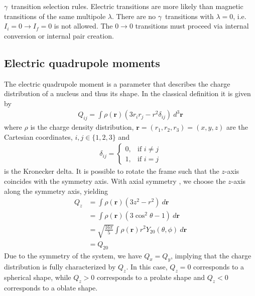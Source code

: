 \documentclass[twoside,english]{uiofysmaster/uiofysmaster}
\newcommand{\ga}{$\gamma$}
\begin{document}
\begin{table}[htb!] 
    \centering 
    \caption{\ga\ transition selection rules. Electric transitions are more likely than magnetic transitions of the same multipole $\lambda$. There are no \ga\ transitions with $\lambda = 0$, i.e. $I_i = 0 \rightarrow I_f = 0$ is not allowed. The $0 \rightarrow 0$ transitions must proceed via internal conversion or internal pair creation.}
	
	\label{tab:gamma_sel}
\end{table}



\subsection{Electric quadrupole moments}
The electric quadrupole moment is a parameter that describes the charge distribution of a nucleus and thus its shape.
In the classical definition it is given by
\begin{align}
	Q_{ij} = \int \rho(\mathbf{r}) (3r_i r_j - r^2 \delta_{ij}) ~d^3 \mathbf{r}
\end{align}
where $\rho$ is the charge density distribution, $\mathbf{r} = (r_1, r_2, r_3) = (x, y, z)$ are the Cartesian coordinates, $i,j \in \{ 1, 2, 3 \}$ and
\begin{align}
	\delta_{ij} =
    \begin{cases}
    		0, & \text{if } i \neq j \\
    		1, & \text{if } i = j
    \end{cases}
\end{align}
is the Kronecker delta.
It is possible to rotate the frame such that the $z$-axis coincides with the symmetry axis. 
With axial symmetry \cite{Niedermaier, ELP}, we choose the $z$-axis along the symmetry axis, yielding
\begin{align}
	Q_z &= \int \rho(\mathbf{r}) (3z^2 - r^2) ~d \mathbf{r} \nonumber \\
	&=  \int \rho(\mathbf{r}) (3\cos^2 \theta - 1) ~d \mathbf{r} \nonumber \\
	&=  \sqrt{\frac{16\pi}{5}} \int \rho(\mathbf{r}) r^2 Y_{20}(\theta, \phi) ~d \mathbf{r} \nonumber \\
	&= Q_{20}
\end{align}
Due to the symmetry of the system, we have $Q_x = Q_y$, implying that the charge distribution is fully characterized by $Q_z$. 
In this case, $Q_z = 0$ corresponds to a spherical shape, while $Q_z > 0$ corresponds to a prolate shape and $Q_z < 0$ corresponds to a oblate shape.
\end{document}
